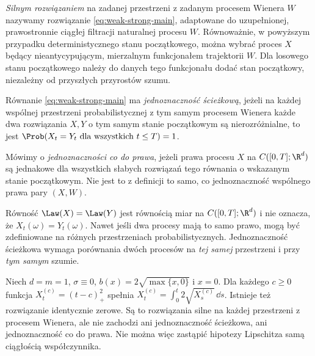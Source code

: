\begin{definicja}
\label{def:strong-solution-precise}
\emph{Silnym rozwiązaniem} na zadanej przestrzeni z zadanym
procesem Wienera $W$ nazywamy rozwiązanie
\eqref{eq:weak-strong-main}, adaptowane do uzupełnionej,
prawostronnie ciągłej filtracji naturalnej procesu $W$.
Równoważnie, w powyższym przypadku deterministycznego stanu
początkowego, można wybrać proces $X$ będący nieantycypującym,
mierzalnym funkcjonałem trajektorii $W$. Dla losowego stanu
początkowego należy do danych tego funkcjonału dodać stan
początkowy, niezależny od przyszłych przyrostów szumu.
\end{definicja}

\begin{definicja}
\label{def:path-law-uniq}
Równanie \eqref{eq:weak-strong-main} ma
\emph{jednoznaczność ścieżkową}, jeżeli na każdej wspólnej
przestrzeni probabilistycznej z tym samym procesem Wienera
każde dwa rozwiązania $X,Y$ o tym samym stanie początkowym
są nierozróżnialne, to jest
$\Prob(X_t=Y_t\text{ dla wszystkich }t\le T)=1$.

Mówimy o \emph{jednoznaczności co do prawa}, jeżeli prawa
procesu $X$ na $C([0,T];\R^d)$ są jednakowe dla wszystkich
słabych rozwiązań tego równania o wskazanym stanie początkowym.
Nie jest to z definicji to samo, co jednoznaczność wspólnego
prawa pary $(X,W)$.
\end{definicja}

\begin{uwaga}
Równość $\Law(X)=\Law(Y)$ jest równością miar na
$C([0,T];\R^d)$ i nie oznacza, że $X_t(\omega)=Y_t(\omega)$.
Nawet jeśli dwa procesy mają to samo prawo, mogą być
zdefiniowane na różnych przestrzeniach probabilistycznych.
Jednoznaczność ścieżkowa wymaga porównania dwóch procesów
na \emph{tej samej} przestrzeni i przy \emph{tym samym} szumie.
\end{uwaga}

\begin{przyklad}
Niech $d=m=1$, $\sigma\equiv0$,
$b(x)=2\sqrt{\max\{x,0\}}$ i $x=0$.
Dla każdego $c\ge0$ funkcja
$X_t^{(c)}=(t-c)_+^2$ spełnia
$X_t^{(c)}=\int_0^t2\sqrt{X_s^{(c)}}\,\dd s$.
Istnieje też rozwiązanie identycznie zerowe.
Są to rozwiązania silne na każdej przestrzeni z procesem
Wienera, ale nie zachodzi ani jednoznaczność ścieżkowa,
ani jednoznaczność co do prawa. Nie można więc zastąpić
hipotezy Lipschitza samą ciągłością współczynnika.
\end{przyklad}

